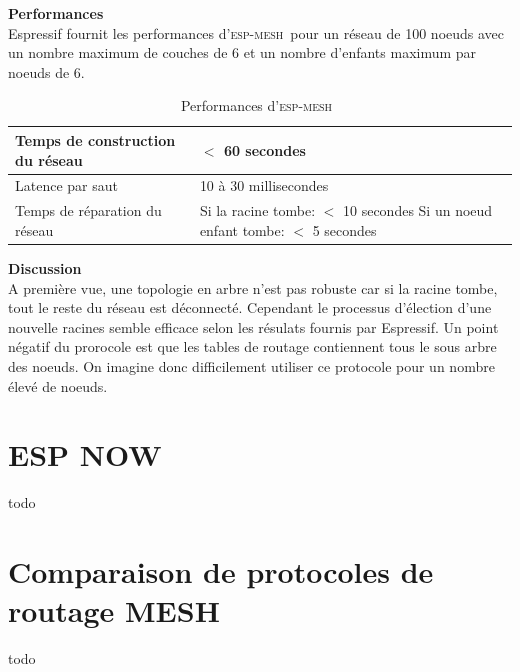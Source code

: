 \documentclass[a4paper, 12pt]{report}
\newcommand{\espmesh}{\textsc{esp-mesh}}
\begin{document}
    \vspace{0.5cm}
    \textbf{Performances}\\
        Espressif fournit les performances d'\espmesh\ pour un réseau de 100 noeuds avec un nombre maximum de couches de 6 et un nombre d'enfants maximum par noeuds de 6.

        \begin{table}[H]
            \begin{tabular}{|l|l|}
                \hline
                Temps de construction du réseau & $<$ 60 secondes\\ \hline
                Latence par saut & 10 à 30 millisecondes\\ \hline
                Temps de réparation du réseau & \makecell{Si la racine tombe: $<$ 10 secondes \\ Si un noeud enfant tombe: $<$ 5 secondes}\\ \hline
            \end{tabular}
            \caption{Performances d'\espmesh\ \cite{ESP-MESH}}
        \end{table}

        
    \textbf{Discussion}\\
        A première vue, une topologie en arbre n'est pas robuste car si la racine tombe,
        tout le reste du réseau est déconnecté. Cependant le processus d'élection
        d'une nouvelle racines semble efficace selon les résulats fournis par Espressif.
        Un point négatif du prorocole est que les tables de routage contiennent tous le sous arbre des noeuds.
        On imagine donc difficilement utiliser ce protocole pour un nombre élevé de noeuds.

\section{ESP NOW}
    todo

\section{Comparaison de protocoles de routage MESH}
    todo


{}

\end{document}

